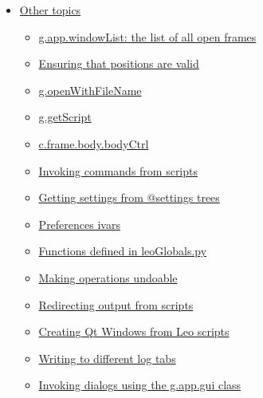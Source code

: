 \documentclass[a4paper,10pt,english]{sphinxmanual}
\begin{document}
{\begin{minipage}{0.95\linewidth}
\begin{itemize}
\begin{itemize}
\begin{itemize}
\end{itemize}

\item {} 
{\hyperref[scripting:other-topics]{Other topics}}
\begin{itemize}
\item {} 
{\hyperref[scripting:g-app-windowlist-the-list-of-all-open-frames]{g.app.windowList: the list of all open frames}}

\item {} 
{\hyperref[scripting:ensuring-that-positions-are-valid]{Ensuring that positions are valid}}

\item {} 
{\hyperref[scripting:g-openwithfilename]{g.openWithFileName}}

\item {} 
{\hyperref[scripting:g-getscript]{g.getScript}}

\item {} 
{\hyperref[scripting:c-frame-body-bodyctrl]{c.frame.body.bodyCtrl}}

\item {} 
{\hyperref[scripting:invoking-commands-from-scripts]{Invoking commands from scripts}}

\item {} 
{\hyperref[scripting:getting-settings-from-settings-trees]{Getting settings from @settings trees}}

\item {} 
{\hyperref[scripting:preferences-ivars]{Preferences ivars}}

\item {} 
{\hyperref[scripting:functions-defined-in-leoglobals-py]{Functions defined in leoGlobals.py}}

\item {} 
{\hyperref[scripting:making-operations-undoable]{Making operations undoable}}

\item {} 
{\hyperref[scripting:redirecting-output-from-scripts]{Redirecting output from scripts}}

\item {} 
{\hyperref[scripting:creating-qt-windows-from-leo-scripts]{Creating Qt Windows from Leo scripts}}

\item {} 
{\hyperref[scripting:writing-to-different-log-tabs]{Writing to different log tabs}}

\item {} 
{\hyperref[scripting:invoking-dialogs-using-the-g-app-gui-class]{Invoking dialogs using the g.app.gui class}}


\end{itemize}
\end{itemize}
\end{itemize}
\end{minipage}}
\end{document}
